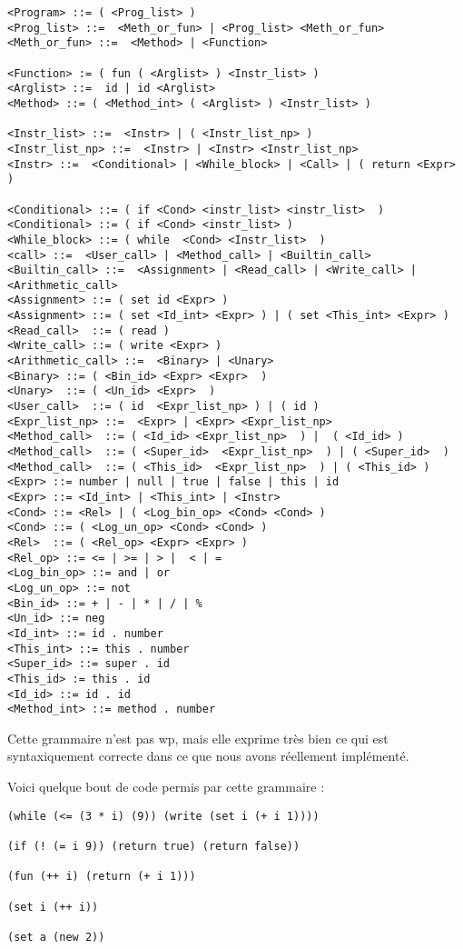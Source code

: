\begin{verbatim}
<Program> ::= ( <Prog_list> )
<Prog_list> ::=  <Meth_or_fun> | <Prog_list> <Meth_or_fun>	
<Meth_or_fun> ::=  <Method> | <Function>

<Function> := ( fun ( <Arglist> ) <Instr_list> ) 
<Arglist> ::=  id | id <Arglist>
<Method> ::= ( <Method_int> ( <Arglist> ) <Instr_list> )
 
<Instr_list> ::=  <Instr> | ( <Instr_list_np> ) 
<Instr_list_np> ::=  <Instr> | <Instr> <Instr_list_np>
<Instr> ::=  <Conditional> | <While_block> | <Call> | ( return <Expr> ) 

<Conditional> ::= ( if <Cond> <instr_list> <instr_list>  )  
<Conditional> ::= ( if <Cond> <instr_list> )
<While_block> ::= ( while  <Cond> <Instr_list>  ) 
<call> ::=  <User_call> | <Method_call> | <Builtin_call> 
<Builtin_call> ::=  <Assignment> | <Read_call> | <Write_call> | <Arithmetic_call>
<Assignment> ::= ( set id <Expr> ) 
<Assignment> ::= ( set <Id_int> <Expr> ) | ( set <This_int> <Expr> )
<Read_call>  ::= ( read )
<Write_call> ::= ( write <Expr> )
<Arithmetic_call> ::=  <Binary> | <Unary>
<Binary> ::= ( <Bin_id> <Expr> <Expr>  )
<Unary>  ::= ( <Un_id> <Expr>  )
<User_call>  ::= ( id  <Expr_list_np> ) | ( id ) 
<Expr_list_np> ::=  <Expr> | <Expr> <Expr_list_np>
<Method_call>  ::= ( <Id_id> <Expr_list_np>  ) |  ( <Id_id> )   
<Method_call>  ::= ( <Super_id>  <Expr_list_np>  ) | ( <Super_id>  )
<Method_call>  ::= ( <This_id>  <Expr_list_np>  ) | ( <This_id> )
<Expr> ::= number | null | true | false | this | id 
<Expr> ::= <Id_int> | <This_int> | <Instr>
<Cond> ::= <Rel> | ( <Log_bin_op> <Cond> <Cond> )
<Cond> ::= ( <Log_un_op> <Cond> <Cond> )
<Rel>  ::= ( <Rel_op> <Expr> <Expr> ) 
<Rel_op> ::= <= | >= | > |  < | =
<Log_bin_op> ::= and | or
<Log_un_op> ::= not
<Bin_id> ::= + | - | * | / | %
<Un_id> ::= neg
<Id_int> ::= id . number
<This_int> ::= this . number
<Super_id> ::= super . id
<This_id> := this . id 
<Id_id> ::= id . id
<Method_int> ::= method . number
\end{verbatim}
Cette grammaire n'est pas wp, mais elle exprime très bien ce qui est syntaxiquement correcte dans ce que nous avons réellement implémenté. 

Voici quelque bout de code permis par cette grammaire :

\begin{verbatim}
(while (<= (3 * i) (9)) (write (set i (+ i 1))))
  
(if (! (= i 9)) (return true) (return false))

(fun (++ i) (return (+ i 1)))

(set i (++ i))

(set a (new 2))
\end{verbatim}

